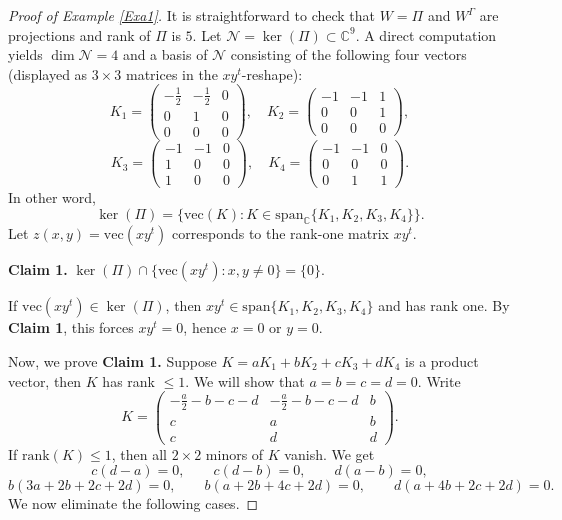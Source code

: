 \documentclass[12pt,a4paper]{amsart}
\theoremstyle{plain}
\theoremstyle{remark}
\theoremstyle{definition}
\begin{document}
\begin{proof}[Proof of Example \ref{Exa1}]
It is straightforward to check that $W=\Pi$ and $W^{\Gamma}$  are projections and rank of $\Pi$ is $5.$
Let $\mathcal N=\ker(\Pi)\subset\mathbb C^9$. A direct computation yields $\dim \mathcal N=4$ and a basis of $\mathcal N$ consisting of the following four vectors (displayed as $3\times 3$ matrices in the $xy^{t}$-reshape):
\[
K_1=
\begin{pmatrix}
	-\frac12&-\frac12&0\\
	0&1&0\\
	0&0&0
\end{pmatrix},\quad
K_2=
\begin{pmatrix}
	-1&-1&1\\
	0&0&1\\
	0&0&0
\end{pmatrix}, \]  
\[ K_3=
\begin{pmatrix}
	-1&-1&0\\
	1&0&0\\
	1&0&0
\end{pmatrix},\quad
K_4=
\begin{pmatrix}
	-1&-1&0\\
	0&0&0\\
	0&1&1
\end{pmatrix}.
\]
In other word,
\[
\ker(\Pi)=\{\mathrm{vec}(K): K\in \mathrm{span}_{\mathbb C}\{K_1,K_2,K_3,K_4\}\}.
\]
Let $z(x,y)=\mathrm{vec}(x y^{t})$ corresponds to the rank-one matrix $xy^{t}$.

\textbf{Claim 1.}
$
\ker(\Pi)\cap \{ \mathrm{vec}(xy^{t}) : x,y\neq 0\}=\{0\}.
$

If $\mathrm{vec}(xy^{t})\in\ker(\Pi)$, then $xy^{t}\in\mathrm{span}\{K_1,K_2,K_3,K_4\}$ and has rank one.
By \textbf{Claim 1}, this forces $xy^{t}=0$, hence $x=0$ or $y=0$.

Now, we prove \textbf{Claim 1.} 
Suppose $K=aK_1+bK_2+cK_3+dK_4$ is a product vector, then $K$ has rank $\le 1.$ We will show that  $a=b=c=d=0$.
	Write %
	\[
	K=
	\begin{pmatrix}
		-\frac a2-b-c-d & -\frac a2-b-c-d & b\\
		c & a & b\\
		c & d & d
	\end{pmatrix}.
	\]
	If $\mathrm{rank}(K)\le 1$, then all $2\times 2$ minors of $K$ vanish. We get
	\[
	c(d-a)=0,\qquad c(d-b)=0,\qquad d(a-b)=0,
	\]
	\[
	b(3a+2b+2c+2d)=0,\qquad b(a+2b+4c+2d)=0,\qquad d(a+4b+2c+2d)=0.
	\]
	We now eliminate the following cases.
	

\end{proof}
\end{document}

